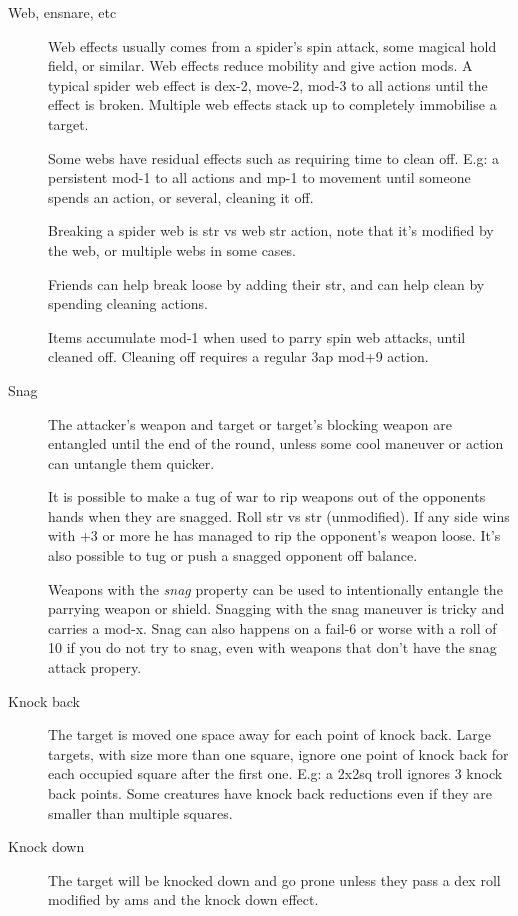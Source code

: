 \begin{description}
\item[Web, ensnare, etc]
Web effects usually comes from a spider's spin attack, some magical hold field, or similar. Web effects reduce mobility and give action mods.
A typical spider web effect is dex-2, move-2, mod-3 to all actions until the effect is broken. Multiple web effects stack up to completely immobilise a target.

Some webs have residual effects such as requiring time to clean off. E.g: a persistent mod-1 to all actions and mp-1 to movement until someone spends an action, or several, cleaning it off.

Breaking a spider web is str vs web str action, note that it's modified by the web, or multiple webs in some cases.

Friends can help break loose by adding their str, and can help clean by spending cleaning actions.

Items accumulate mod-1 when used to parry spin web attacks, until cleaned off. Cleaning off requires a regular 3ap mod+9 action.


\item[Snag]
The attacker's weapon and target or target's blocking weapon are entangled until the end of the round, unless some cool maneuver or action can untangle them quicker.

It is possible to make a tug of war to rip weapons out of the opponents hands when they are snagged. Roll str vs str (unmodified). If any side wins with +3 or more he has managed to rip the opponent's weapon loose. It's also possible to tug or push a snagged opponent off balance.

Weapons with the \emph{snag} property can be used to intentionally entangle the parrying weapon or shield. Snagging with the snag maneuver is tricky and carries a mod-x. Snag can also happens on a fail-6 or worse with a roll of 10 if you do not try to snag, even with weapons that don't have the snag attack propery.


\item[Knock back]
The target is moved one space away for each point of knock back. 
Large targets, with size more than one square, ignore one point of knock back for each occupied square after the first one. E.g: a 2x2sq troll ignores 3 knock back points.
Some creatures have knock back reductions even if they are smaller than multiple squares.


\item[Knock down]
The target will be knocked down and go prone unless they pass a dex roll modified by ams and the knock down effect.


\end{description}






